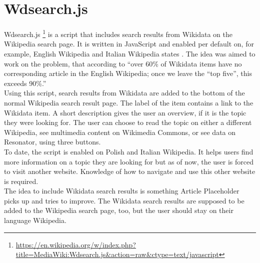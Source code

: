 \section{Wdsearch.js}
Wdsearch.js \footnote{\url{https://en.wikipedia.org/w/index.php?title=MediaWiki:Wdsearch.js&action=raw&ctype=text/javascript}} is a script that includes search results from Wikidata on the Wikipedia search page. It is written in JavaScript and enabled per default on, for example, English Wikipedia and Italian Wikipedia states \citet{gerardm:01, gerardm:02}.
The idea was aimed to work on the problem, that according to \citet{manske:01} ``over 60\% of Wikidata items have no corresponding article in the English Wikipedia; once we leave the “top five”, this exceeds 90\%.'' \\
Using this script, search results from Wikidata are added to the bottom of the normal Wikipedia search result page. The label of the item contains a link to the Wikidata item. A short description gives the user an overview, if it is the topic they were looking for. The user can choose to read the topic on either a different Wikipedia, see multimedia content on Wikimedia Commons, or see data on Resonator, using three buttons. \\
To date, the script is enabled on Polish and Italian Wikipedia. It helps users find more information on a topic they are looking for but as of now, the user is forced to visit another website. Knowledge of how to navigate and use this other website is required. \\
The idea to include Wikidata search results is something Article Placeholder picks up and tries to improve. The Wikidata search results are supposed to be added to the Wikipedia search page, too, but the user should stay on their language Wikipedia.
